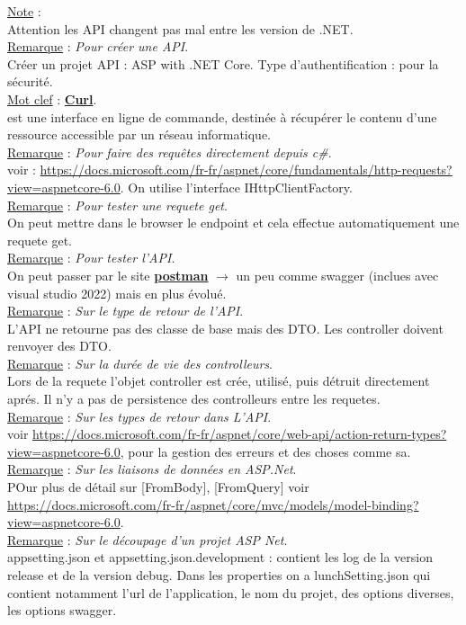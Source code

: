 \documentclass[a4paper,12pt,twoside]{article}
\newcommand{\urlcolor}{magenta}  %
\newcommand{\keycolor}{purple} %
\newcommand{\incode}[1]{{\footnotesize\ttfamily #1}} %
\newcommand{\rem}[2]{\noindent\underline{Remarque} : \textit{#1}.\\ \indent #2}
\newcommand{\note}[1]{\noindent\underline{Note} : \\ \indent #1}
\newcommand{\keyref}[2]{\hypersetup{urlcolor=\keycolor} \href{#1}{\textbf{#2}}\hypersetup{urlcolor=\urlcolor}}
\newcommand{\keyword}[3]{\noindent\underline{Mot clef} : \keyref{#1}{#2}. \\ \indent #3}
\begin{document}
\note{Attention les API changent pas mal entre les version de .NET.}\\

\rem{Pour créer une API}{Créer un projet API : ASP with .NET Core. Type d'authentification : pour la sécurité.}\\

\keyword{https://fr.wikipedia.org/wiki/CURL}{Curl}{ est une interface en ligne de commande, destinée à récupérer le contenu d'une ressource accessible par un réseau informatique.}\\

\rem{Pour faire des requêtes directement depuis c\#}{voir : \url{https://docs.microsoft.com/fr-fr/aspnet/core/fundamentals/http-requests?view=aspnetcore-6.0}. On utilise l'interface \incode{IHttpClientFactory}.}\\

\rem{Pour tester une requete get}{On peut mettre dans le browser le endpoint et cela effectue automatiquement une requete get.}\\

\rem{Pour tester l'API}{On peut passer par le site \keyref{https://www.postman.com/}{postman} $\to$ un peu comme swagger (inclues avec visual studio 2022) mais en plus évolué.}\\

\rem{Sur le type de retour de l'API}{L'API ne retourne pas des classe de base mais des DTO. Les controller doivent renvoyer des DTO.}\\

\rem{Sur la durée de vie des controlleurs}{Lors de la requete l'objet controller est crée, utilisé, puis détruit directement aprés. Il n'y a pas de persistence des controlleurs entre les requetes.}\\

\rem{Sur les types de retour dans L'API}{voir \url{https://docs.microsoft.com/fr-fr/aspnet/core/web-api/action-return-types?view=aspnetcore-6.0}, pour la gestion des erreurs et des choses comme sa.}\\

\rem{Sur les liaisons de données en ASP.Net}{POur plus de détail sur [FromBody], [FromQuery] voir \url{https://docs.microsoft.com/fr-fr/aspnet/core/mvc/models/model-binding?view=aspnetcore-6.0}.}\\

\rem{Sur le découpage d'un projet ASP Net}{appsetting.json et appsetting.json.development : contient les log de la version release et de la version debug. Dans les properties on a lunchSetting.json qui contient notamment l'url de l'application, le nom du projet, des options diverses, les options swagger.}\\
\end{document}
